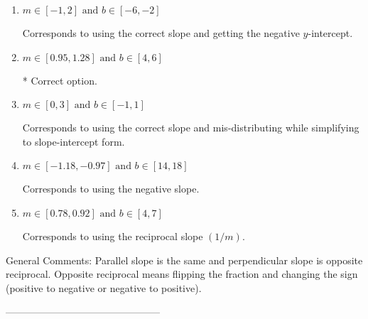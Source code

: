 \documentclass{article}[10pt]
\begin{document}
\begin{enumerate}[label=\Alph*.] 
\item $ m \in [-1, 2] \text{ and } b \in [-6, -2] $ 

  Corresponds to using the correct slope and getting the negative $y$-intercept. 
\item $ m \in [0.95, 1.28] \text{ and } b \in [4, 6] $ 

 * Correct option. 
\item $ m \in [0, 3] \text{ and } b \in [-1, 1] $ 

  Corresponds to using the correct slope and mis-distributing while simplifying to slope-intercept form. 
\item $ m \in [-1.18, -0.97] \text{ and } b \in [14, 18] $ 

  Corresponds to using the negative slope. 
\item $ m \in [0.78, 0.92] \text{ and } b \in [4, 7] $ 

  Corresponds to using the reciprocal slope $(1/m)$. 
\end{enumerate} 
 
General Comments: Parallel slope is the same and perpendicular slope is opposite reciprocal. Opposite reciprocal means flipping the fraction and changing the sign (positive to negative or negative to positive).

-----------------------------------------------
\end{document}
